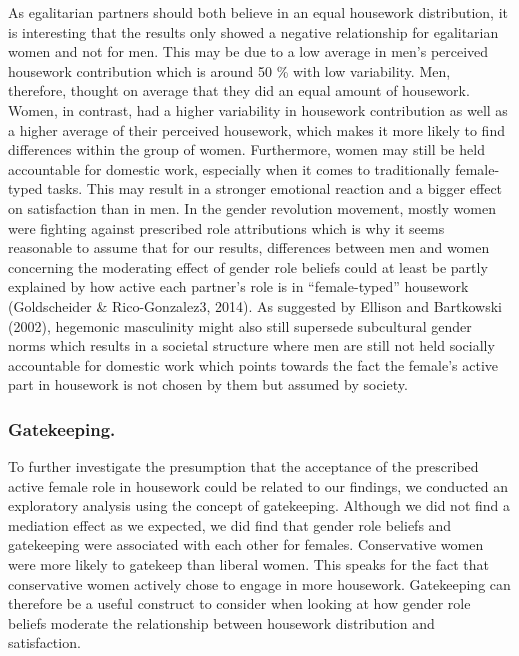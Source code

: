 \documentclass[
  man,floatsintext]{apa6}
\begin{document}
As egalitarian partners should both believe in an equal housework distribution, it is interesting that the results only showed a negative relationship for egalitarian women and not for men. This may be due to a low average in men's perceived housework contribution which is around 50 \% with low variability. Men, therefore, thought on average that they did an equal amount of housework. Women, in contrast, had a higher variability in housework contribution as well as a higher average of their perceived housework, which makes it more likely to find differences within the group of women. Furthermore, women may still be held accountable for domestic work, especially when it comes to traditionally female-typed tasks. This may result in a stronger emotional reaction and a bigger effect on satisfaction than in men. In the gender revolution movement, mostly women were fighting against prescribed role attributions which is why it seems reasonable to assume that for our results, differences between men and women concerning the moderating effect of gender role beliefs could at least be partly explained by how active each partner's role is in ``female-typed'' housework (Goldscheider \& Rico-Gonzalez3, 2014). As suggested by Ellison and Bartkowski (2002), hegemonic masculinity might also still supersede subcultural gender norms which results in a societal structure where men are still not held socially accountable for domestic work which points towards the fact the female's active part in housework is not chosen by them but assumed by society.

\hypertarget{gatekeeping.}{%
\subsubsection{Gatekeeping.}\label{gatekeeping.}}

To further investigate the presumption that the acceptance of the prescribed active female role in housework could be related to our findings, we conducted an exploratory analysis using the concept of gatekeeping. Although we did not find a mediation effect as we expected, we did find that gender role beliefs and gatekeeping were associated with each other for females. Conservative women were more likely to gatekeep than liberal women. This speaks for the fact that conservative women actively chose to engage in more housework. Gatekeeping can therefore be a useful construct to consider when looking at how gender role beliefs moderate the relationship between housework distribution and satisfaction.
\end{document}
